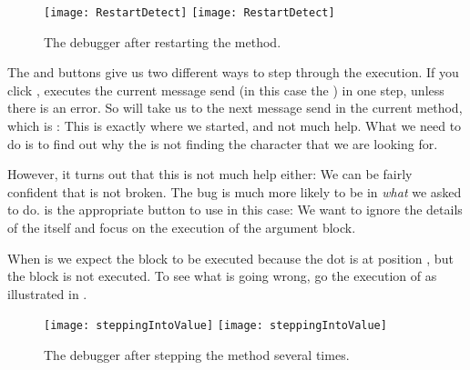 \documentclass[a4paper,10pt,twoside]{book}
\begin{document}
\begin{figure}[btp]
	\begin{center}
	\ifluluelse
		{\texttt{[image: RestartDetect]}}
		{\texttt{[image: RestartDetect]}}
	\end{center}
	\caption{The debugger after restarting the  method.}
	\label{fig:RestartDetect}
\end{figure}

The  and  buttons give us two different ways to step through the execution.
If you click , \sq executes the current message send (in this case the ) in one step, unless there is an error.
So  will take us to the next message send in the current method, which is :
This is exactly where we started, and not much help.
What we need to do is to find out why the  is not finding the character that we are looking for.



However, it turns out that this is not much help either:
We can be fairly confident that  is not broken.
The bug is much more likely to be in \emph{what} we asked \sq to do.
 is the appropriate button to use in this case:
We want to ignore the details of the  itself and focus on the execution of the argument block.


When  is  we expect the  block to be executed because the dot is at position , but the  block is not executed.
To see what is going wrong, go  the execution of  as illustrated in .

\begin{figure}[btp]
	\begin{center}
	\ifluluelse
		{\texttt{[image: steppingIntoValue]}}
		{\texttt{[image: steppingIntoValue]}}
	\end{center}
	\caption{The debugger after stepping  the  method several times.}
	\label{fig:steppingIntoValue}
\end{figure}
\end{document}
